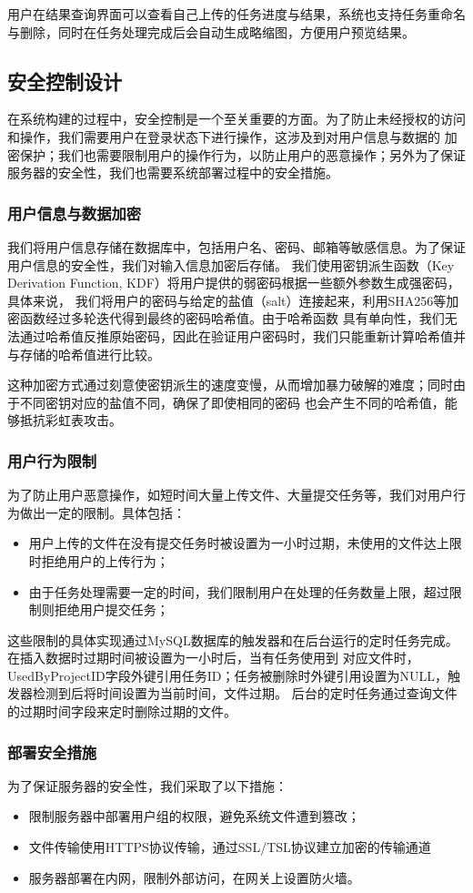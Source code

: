 用户在结果查询界面可以查看自己上传的任务进度与结果，系统也支持任务重命名与删除，同时在任务处理完成后会自动生成略缩图，方便用户预览结果。

\subsection{安全控制设计}

在系统构建的过程中，安全控制是一个至关重要的方面。为了防止未经授权的访问和操作，我们需要用户在登录状态下进行操作，这涉及到对用户信息与数据的
加密保护；我们也需要限制用户的操作行为，以防止用户的恶意操作；另外为了保证服务器的安全性，我们也需要系统部署过程中的安全措施。

\subsubsection{用户信息与数据加密}

我们将用户信息存储在数据库中，包括用户名、密码、邮箱等敏感信息。为了保证用户信息的安全性，我们对输入信息加密后存储。
我们使用密钥派生函数（Key Derivation Function, KDF）将用户提供的弱密码根据一些额外参数生成强密码，具体来说，
我们将用户的密码与给定的盐值（salt）连接起来，利用SHA256等加密函数经过多轮迭代得到最终的密码哈希值。由于哈希函数
具有单向性，我们无法通过哈希值反推原始密码，因此在验证用户密码时，我们只能重新计算哈希值并与存储的哈希值进行比较。

这种加密方式通过刻意使密钥派生的速度变慢，从而增加暴力破解的难度；同时由于不同密钥对应的盐值不同，确保了即使相同的密码
也会产生不同的哈希值，能够抵抗彩虹表攻击。

\subsubsection{用户行为限制}

为了防止用户恶意操作，如短时间大量上传文件、大量提交任务等，我们对用户行为做出一定的限制。具体包括：
\begin{itemize}
    \item 用户上传的文件在没有提交任务时被设置为一小时过期，未使用的文件达上限时拒绝用户的上传行为；
    \item 由于任务处理需要一定的时间，我们限制用户在处理的任务数量上限，超过限制则拒绝用户提交任务；
\end{itemize}
这些限制的具体实现通过MySQL数据库的触发器和在后台运行的定时任务完成。在插入数据时过期时间被设置为一小时后，当有任务使用到
对应文件时，UsedByProjectID字段外键引用任务ID；任务被删除时外键引用设置为NULL，触发器检测到后将时间设置为当前时间，文件过期。
后台的定时任务通过查询文件的过期时间字段来定时删除过期的文件。

\subsubsection{部署安全措施}

为了保证服务器的安全性，我们采取了以下措施：
\begin{itemize}
    \item 限制服务器中部署用户组的权限，避免系统文件遭到篡改；
    \item 文件传输使用HTTPS协议传输，通过SSL/TSL协议建立加密的传输通道
    \item 服务器部署在内网，限制外部访问，在网关上设置防火墙。
\end{itemize}